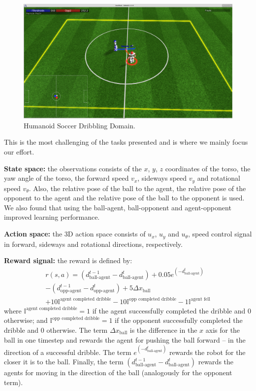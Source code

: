 \begin{figure}[ht]
    \centering
    \includegraphics[width=1.0\textwidth]{Chapter6/soccer_domain.png}
    \caption{Humanoid Soccer Dribbling Domain.}
    \label{fig:soccerdomain}
\end{figure}

This is the most challenging of the tasks presented and is where we mainly focus our effort.

\textbf{State space:} the observations consists of the $x$, $y$, $z$ coordinates of the torso, the yaw
angle of the torso, the forward speed $v_x$, sideways speed $v_y$ and rotational speed $v_{\theta}$.
Also, the relative pose of the ball to the agent, the relative pose of the opponent to the agent and 
the relative pose of the ball to the opponent is used. We also found that using the ball-agent, ball-opponent and
agent-opponent improved learning performance.

\textbf{Action space:} the 3D action space consists of $u_x$, $u_y$ and $u_{\theta}$, speed control signal
in forward, sideways and rotational directions, respectively.

\textbf{Reward signal:} the reward is defined by:
\begin{equation*}
    \begin{split}
r(s,a) = (d^{t-1}_{\text{ball-agent}} - d^{t}_{\text{ball-agent}}) + 0.05 e^{(-d^{t}_{\text{ball-agent}})} \\
- (d^{t-1}_{\text{opp-agent}} - d^{t}_{\text{opp-agent}}) + 5 \Delta x_{\text{ball}} \\
+ 10 \mathbb{I}^{\text{agent completed dribble}} -10 \mathbb{I}^{\text{opp completed dribble}}  - 1 \mathbb{I}^{\text{agent fell}} 
\end{split}
\end{equation*}
where $\mathbb{I}^{\text{agent completed dribble}} = 1$ if the agent successfully completed the dribble and $0$ otherwise; and 
$\mathbb{I}^{\text{opp completed dribble}} = 1$ if the opponent successfully completed the dribble and $0$ otherwise.
The term $\Delta x_{\text{ball}}$ is the difference in the $x$ axis for the ball in one timestep and rewards the agent
for pushing the ball forward -- in the direction of a successful dribble.
The term $e^{(-d^{t}_{\text{ball-agent}})}$ rewards the robot for the closer it is to the ball.
Finally, the term $ (d^{t-1}_{\text{ball-agent}} - d^{t}_{\text{ball-agent}})$ rewards the agents for moving in the direction
of the ball (analogously for the opponent term).

